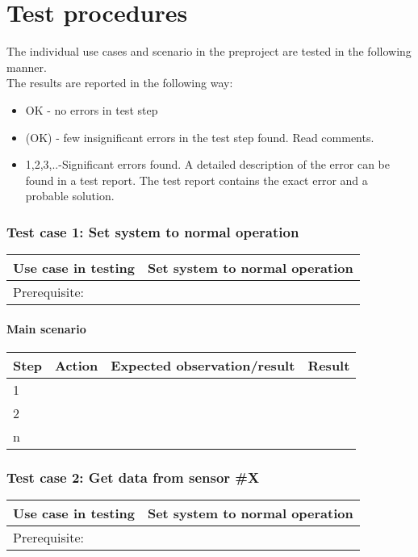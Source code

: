 \chapter{Test procedures}
The individual use cases and scenario in the %
preproject are tested in the following manner.\\

The results are reported in the following way:
\begin{itemize}[bullet]
\item OK - no errors in test step
\item (OK) - few insignificant errors in the test step found. Read comments.
\item 1,2,3,..-Significant errors found. A detailed description of  the error can be found in a test report. The test report contains the exact error and a probable solution.
\end{itemize}

\subsection{Test case 1: Set system to normal operation}
\begin{table}[H]
    \begin{tabular}{|l|l|}
    \hline
    Use case in testing & Set system to normal operation \\ \hline
    Prerequisite: & ~ \\ \hline
    \end{tabular}
\end{table}

\subsubsection{Main scenario}
\begin{table}[H]
    \begin{tabular}{|l|l|l|l|}
    \hline
    Step & Action & Expected observation/result & Result \\ \hline
    1 & ~ & ~ & ~ \\ \hline
    2 & ~ & ~ & ~ \\ \hline
    n & ~ & ~ & ~ \\ \hline
    \end{tabular}
\end{table}

\subsection{Test case 2: Get data from sensor \#X}
\begin{table}[H]
    \begin{tabular}{|l|l|}
    \hline
    Use case in testing & Set system to normal operation \\ \hline
    Prerequisite: & ~ \\ \hline
    \end{tabular}
\end{table}

